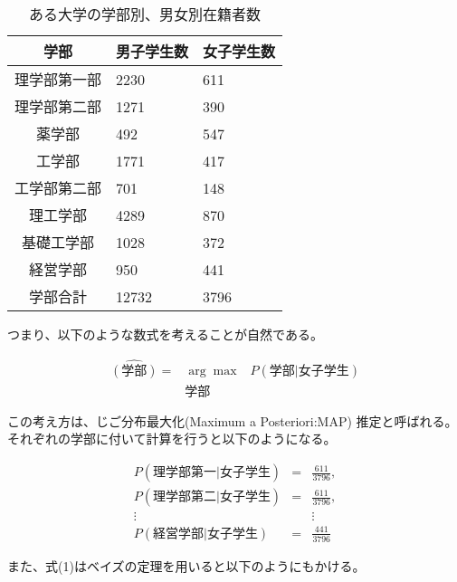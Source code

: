 \documentclass{jsarticle}
\begin{document}
    \begin{table}[htb]
      \begin{center}
        \caption{ある大学の学部別、男女別在籍者数}
        \begin{tabular}{|c|l|l|} \hline
          学部         & 男子学生数 & 女子学生数\\ \hline
          理学部第一部 & 2230       & 611       \\
          理学部第二部 & 1271       & 390       \\
          薬学部       & 492        & 547       \\
          工学部       & 1771       & 417       \\
          工学部第二部 & 701        & 148       \\
          理工学部     & 4289       & 870       \\
          基礎工学部   & 1028       & 372       \\
          経営学部     & 950        & 441       \\
          学部合計     & 12732      & 3796      \\ \hline
        \end{tabular}
      \end{center}
    \end{table}

    つまり、以下のような数式を考えることが自然である。

    \begin{eqnarray*}
      \hat{(\mbox{学部})} = &\arg \max& P(\mbox{学部} | 女子学生) \\
                            &学部&
    \end{eqnarray*}

    この考え方は、じご分布最大化(Maximum a Posteriori:MAP) 推定と呼ばれる。
    それぞれの学部に付いて計算を行うと以下のようになる。

    \begin{eqnarray*}
      P(\mbox{理学部第一} | \mbox{女子学生}) &=& \frac{611}{3796}, \\
      P(\mbox{理学部第二} | \mbox{女子学生}) &=& \frac{611}{3796}, \\
        \vdots                               &&  \vdots            \\
      P(\mbox{経営学部}   | \mbox{女子学生}) &=& \frac{441}{3796}
    \end{eqnarray*}


    また、式(1)はベイズの定理を用いると以下のようにもかける。
\end{document}
